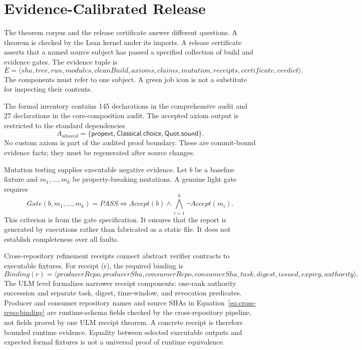 \section{Evidence-Calibrated Release}
\label{sec:evidence}

The theorem corpus and the release certificate answer different questions. A theorem is checked by the Lean kernel under its imports. A release certificate asserts that a named source subject has passed a specified collection of build and evidence gates. The evidence tuple is
\begin{equation}
E=\langle sha,tree,run,modules,cleanBuild,axioms,claims,
mutation,receipts,certificate,verdict\rangle.
\label{eq:evidence-tuple}
\end{equation}
The components must refer to one subject. A green job icon is not a substitute for inspecting their contents.

The formal inventory contains 145 declarations in the comprehensive audit and 27 declarations in the core-composition audit. The accepted axiom output is restricted to the standard dependencies
\begin{equation}
A_{allowed}=\{\mathsf{propext},\mathsf{Classical.choice},\mathsf{Quot.sound}\}.
\label{eq:allowed-axioms}
\end{equation}
No custom axiom is part of the audited proof boundary. These are commit-bound evidence facts; they must be regenerated after source changes.

Mutation testing supplies executable negative evidence. Let $b$ be a baseline fixture and $m_1,\ldots,m_k$ be property-breaking mutations. A genuine light gate requires
\begin{equation}
Gate(b,m_1,\ldots,m_k)=PASS
\iff Accept(b)\land\bigwedge_{i=1}^{k}\neg Accept(m_i).
\label{eq:mutation-gate}
\end{equation}
This criterion is \derived{} from the gate specification. It ensures that the report is generated by executions rather than fabricated as a static file. It does not establish completeness over all faults.

Cross-repository refinement receipts connect abstract verifier contracts to executable fixtures. For receipt (r), the required binding is
\begin{equation}
Binding(r)=\langle producerRepo,producerSha,consumerRepo,
consumerSha,task,digest,issued,expiry,authority\rangle.
\label{eq:cross-repo-binding}
\end{equation}
The ULM level formalizes narrower receipt components: one-rank authority succession and separate task, digest, time-window, and revocation predicates. Producer and consumer repository names and source SHAs in Equation~\eqref{eq:cross-repo-binding} are runtime-schema fields checked by the cross-repository pipeline, not fields proved by one ULM receipt theorem. A concrete receipt is therefore bounded runtime evidence. Equality between selected executable outputs and expected formal fixtures is not a universal proof of runtime equivalence.

